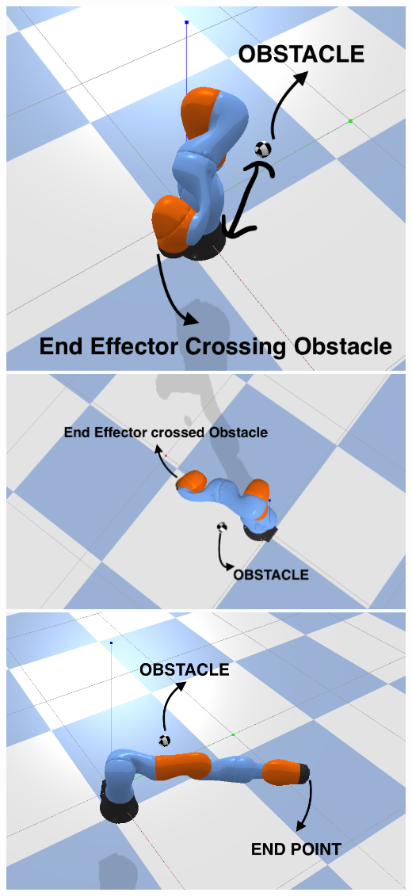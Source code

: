 \documentclass[a4paper]{article}
\begin{document}
\includegraphics[scale=0.5]{images/img5.png}\\
\includegraphics[scale=0.4]{images/img6.png}
\includegraphics[scale=0.4]{images/img7.png}
\bigskip
\end{document}
